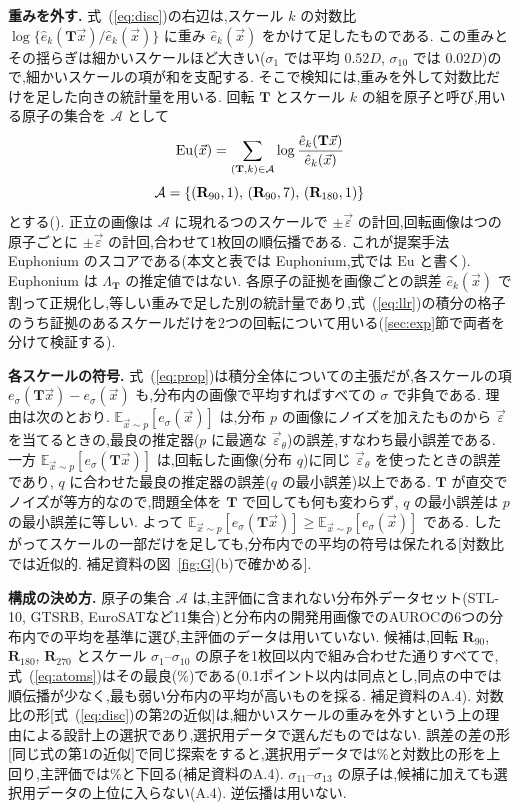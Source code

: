 \documentclass[MIRU,submit,onecolumn]{miru2025j}
\newcommand{\veps}{\vec{\varepsilon}}
\newcommand{\epsth}{\vec{\varepsilon}_\theta}
\newcommand{\E}{\mathbb{E}}
\newcommand{\mT}{\mathbf{T}}            %
\newcommand{\Rot}[1]{\mathbf{R}_{#1}}
\newcommand{\Eu}{\mathrm{Eu}}        %
\renewcommand{\eqref}[1]{(\ref{#1})}   %
\begin{document}
\textbf{重みを外す.}
式~\eqref{eq:disc}の右辺は,スケール $k$ の対数比 $\log\{\hat e_k(\mT\vec{x})/\hat e_k(\vec{x})\}$ に重み $\hat e_k(\vec{x})$ をかけて足したものである. %
この重みとその揺らぎは細かいスケールほど大きい($\sigma_1$ では平均 $0.52D$, $\sigma_{10}$ では $0.02D$)ので,細かいスケールの項が和を支配する. %
そこで検知には,重みを外して対数比だけを足した向きの統計量を用いる. 回転 $\mT$ とスケール $k$ の組を原子と呼び,用いる原子の集合を $\mathcal A$ として
\begin{equation}
\Eu(\vec{x})=\ruleSumText
\label{eq:G}
\end{equation}
\begin{equation}
\mathcal A=\ruleAtomsText
\label{eq:atoms}
\end{equation}
とする(). %
正立の画像は $\mathcal A$ に現れるつのスケールで $\pm\veps$ の計回,回転画像はつの原子ごとに $\pm\veps$ の計回,合わせて1枚\nfeG{}回の順伝播である. %
これが提案手法 Euphonium のスコアである(本文と表では Euphonium,式では $\Eu$ と書く). %
Euphonium は $\Lambda_{\mT}$ の推定値ではない. 各原子の証拠を画像ごとの誤差 $\hat e_k(\vec{x})$ で割って正規化し,等しい重みで足した別の統計量であり,式~\eqref{eq:llr}の積分の格子のうち証拠のあるスケールだけを2つの回転について用いる(\ref{sec:exp}節で両者を分けて検証する).

\textbf{各スケールの符号.}
式~\eqref{eq:prop}は積分全体についての主張だが,各スケールの項 $e_\sigma(\mT\vec{x})-e_\sigma(\vec{x})$ も,分布内の画像で平均すればすべての $\sigma$ で非負である. 理由は次のとおり. %
$\E_{\vec{x}\sim p}[e_\sigma(\vec{x})]$ は,分布 $p$ の画像にノイズを加えたものから $\veps$ を当てるときの,最良の推定器($p$ に最適な $\epsth$)の誤差,すなわち最小誤差である. %
一方 $\E_{\vec{x}\sim p}[e_\sigma(\mT\vec{x})]$ は,回転した画像(分布 $q$)に同じ $\epsth$ を使ったときの誤差であり, $q$ に合わせた最良の推定器の誤差($q$ の最小誤差)以上である. %
$\mT$ が直交でノイズが等方的なので,問題全体を $\mT$ で回しても何も変わらず, $q$ の最小誤差は $p$ の最小誤差に等しい. よって $\E_{\vec{x}\sim p}[e_\sigma(\mT\vec{x})]\ge\E_{\vec{x}\sim p}[e_\sigma(\vec{x})]$ である. %
したがってスケールの一部だけを足しても,分布内での平均の符号は保たれる[対数比では近似的. 補足資料の図~\ref{fig:G}(b)で確かめる].

\textbf{構成の決め方.}
原子の集合 $\mathcal A$ は,主評価に含まれない分布外データセット(STL-10, GTSRB, EuroSATなど11集合)と分布内の開発用画像でのAUROCの6つの分布内での平均を基準に選び,主評価のデータは用いていない. %
候補は,回転 $\Rot{90}$, $\Rot{180}$, $\Rot{270}$ とスケール $\sigma_1$--$\sigma_{10}$ の原子を1枚\nfeG{}回以内で組み合わせた\nCandTwo{}通りすべてで,式~\eqref{eq:atoms}はその最良(\selMean\%)である(0.1ポイント以内は同点とし,同点の中では順伝播が少なく,最も弱い分布内の平均が高いものを採る. 補足資料のA.4). %
対数比の形[式~\eqref{eq:disc}の第2の近似]は,細かいスケールの重みを外すという上の理由による設計上の選択であり,選択用データで選んだものではない. 誤差の差の形[同じ式の第1の近似]で同じ探索をすると,選択用データでは\selDiffBest\%と対数比の形を上回り,主評価では\diffBestMain\%と下回る(補足資料のA.4). %
$\sigma_{11}$--$\sigma_{13}$ の原子は,候補に加えても選択用データの上位に入らない(A.4). 逆伝播は用いない.
\end{document}
